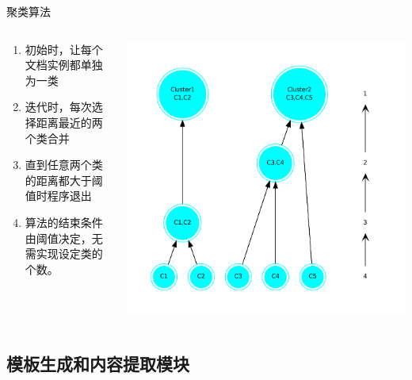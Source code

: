 \begin{frame}[label=sec-2-14]{聚类算法}
\begin{columns}
\begin{column}{0.4\textwidth}
\begin{enumerate}
\item 初始时，让每个文档实例都单独为一类
\item 迭代时，每次选择距离最近的两个类合并
\item 直到任意两个类的距离都大于阈值时程序退出
\item 算法的结束条件由阈值决定，无需实现设定类的个数。
\end{enumerate}

\end{column}

\begin{column}{0.6\textwidth}
\includegraphics[width=\textwidth]{aggloclustering}

\end{column}
\end{columns}
\end{frame}

\subsection{模板生成和内容提取模块}

